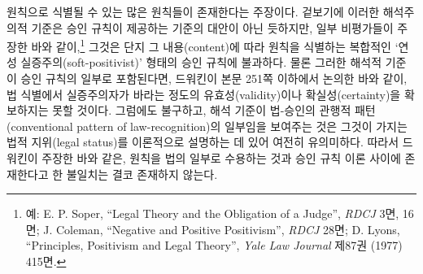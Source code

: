 원칙으로 식별될 수 있는 많은 원칙들이 존재한다는 주장이다. 겉보기에
이러한 해석주의적 기준은 승인 규칙이 제공하는 기준의 대안이 아닌
듯하지만, 일부 비평가들이 주장한 바와 같이,\footnote{예: E. P. Soper,
  ``Legal Theory and the Obligation of a Judge'', \emph{RDCJ} 3면, 16면;
  J. Coleman, ``Negative and Positive Positivism'', \emph{RDCJ} 28면; D.
  Lyons, ``Principles, Positivism and Legal Theory'', \emph{Yale Law
  Journal} 제87권 (1977) 415면.} 그것은 단지 그 내용(content)에 따라
원칙을 식별하는 복합적인 `연성 실증주의(soft-positivist)' 형태의 승인
규칙에 불과하다. 물론 그러한 해석적 기준이 승인 규칙의 일부로
포함된다면, 드워킨이 본문 251쪽 이하에서 논의한 바와 같이, 법 식별에서
실증주의자가 바라는 정도의 유효성(validity)이나 확실성(certainty)을
확보하지는 못할 것이다. 그럼에도 불구하고, 해석 기준이 법-승인의 관행적
패턴(conventional pattern of law-recognition)의 일부임을 보여주는 것은
그것이 가지는 법적 지위(legal status)를 이론적으로 설명하는 데 있어
여전히 유의미하다. 따라서 드워킨이 주장한 바와 같은, 원칙을 법의 일부로
수용하는 것과 승인 규칙 이론 사이에 존재한다고 한 불일치는 결코 존재하지
않는다.

